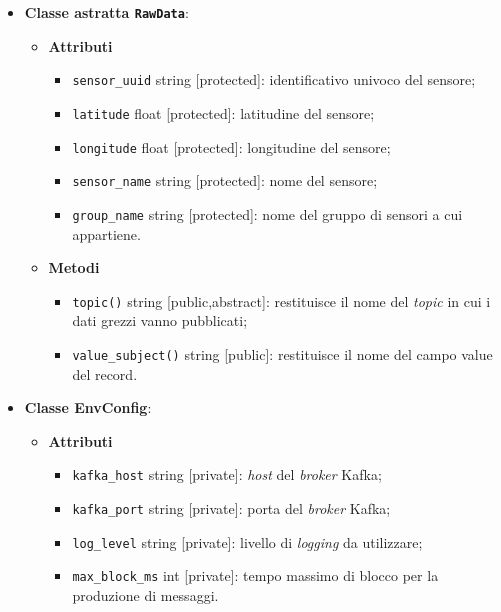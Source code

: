 \begin{itemize}
	\item \textbf{Classe astratta \texttt{RawData}}:
	      \begin{itemize}
		      \item \textbf{Attributi}
		            \begin{itemize}
			            \item \texttt{sensor\_uuid} string [protected]: identificativo univoco del sensore;
			            \item \texttt{latitude} float [protected]: latitudine del sensore;
			            \item \texttt{longitude} float [protected]: longitudine del sensore;
			            \item \texttt{sensor\_name} string [protected]: nome del sensore;
			            \item \texttt{group\_name} string [protected]: nome del gruppo di sensori a cui appartiene.
		            \end{itemize}
		      \item \textbf{Metodi}
		            \begin{itemize}
			            \item \texttt{topic()} string [public,abstract]: restituisce il nome del \textit{topic} in cui i dati grezzi vanno pubblicati;
			            \item \texttt{value\_subject()} string [public]: restituisce il nome del campo value del record.
		            \end{itemize}
	      \end{itemize}
	\item \textbf{Classe EnvConfig}:
	      \begin{itemize}
		      \item \textbf{Attributi}
		            \begin{itemize}
			            \item \texttt{kafka\_host} string [private]: \textit{host} del \textit{broker} Kafka;
			            \item \texttt{kafka\_port} string [private]: porta del \textit{broker} Kafka;
			            \item \texttt{log\_level} string [private]: livello di \textit{logging} da utilizzare;
			            \item \texttt{max\_block\_ms} int [private]: tempo massimo di blocco per la produzione di messaggi.
		            \end{itemize}

\end{itemize}
\end{itemize}
